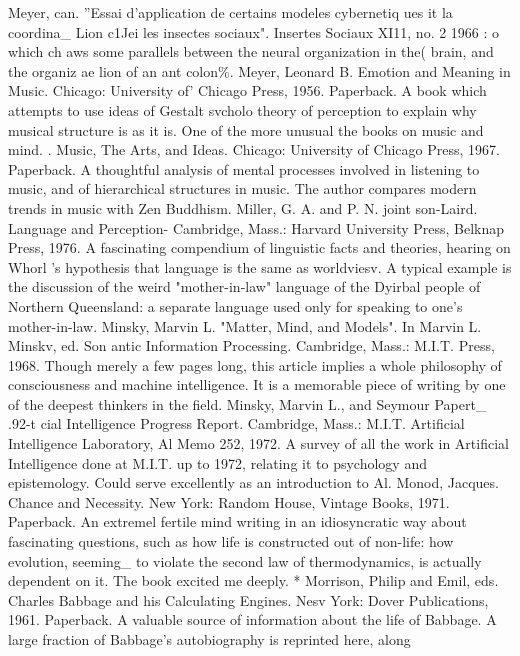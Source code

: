 Meyer, can. ''Essai d'application de certains modeles cybernetiq ues it la coordina\_ Lion
  c1Jei les insectes sociaux". Insertes Sociaux XI11, no. 2 1966 : o which ch aws some
  parallels between the neural organization in the( brain, and the organiz ae lion of an ant
  colon\%.
Meyer, Leonard B. Emotion and Meaning in Music. Chicago: University of' Chicago
  Press, 1956. Paperback. A book which attempts to use ideas of Gestalt svcholo theory
  of perception to explain why musical structure is as it is. One of the more unusual the
  books on music and mind.
. Music, The Arts, and Ideas. Chicago: University of Chicago Press, 1967. Paperback. A
  thoughtful analysis of mental processes involved in listening to music, and of
  hierarchical structures in music. The author compares modern trends in music with Zen
  Buddhism.
Miller, G. A. and P. N. joint son-Laird. Language and Perception- Cambridge, Mass.:
  Harvard University Press, Belknap Press, 1976. A fascinating compendium of linguistic
  facts and theories, hearing on Whorl 's hypothesis that language is the same as
  worldviesv. A typical example is the discussion of the weird "mother-in-law" language
  of the Dyirbal people of Northern Queensland: a separate language used only for
  speaking to one's mother-in-law.
Minsky, Marvin L. "Matter, Mind, and Models". In Marvin L. Minskv, ed. Son antic
  Information Processing. Cambridge, Mass.: M.I.T. Press, 1968. Though merely a few
  pages long, this article implies a whole philosophy of consciousness and machine
  intelligence. It is a memorable piece of writing by one of the deepest thinkers in the
  field.
Minsky, Marvin L., and Seymour Papert\_ .92-t cial Intelligence Progress Report.
  Cambridge, Mass.: M.I.T. Artificial Intelligence Laboratory, Al Memo 252, 1972. A
  survey of all the work in Artificial Intelligence done at M.I.T. up to 1972, relating it to
  psychology and epistemology. Could serve excellently as an introduction to Al.
Monod, Jacques. Chance and Necessity. New York: Random House, Vintage Books,
  1971. Paperback. An extremel fertile mind writing in an idiosyncratic way about
  fascinating questions, such as how life is constructed out of non-life: how evolution,
  seeming\_ to violate the second law of thermodynamics, is actually dependent on it. The
  book excited me deeply.
* Morrison, Philip and Emil, eds. Charles Babbage and his Calculating Engines. Nesv
  York: Dover Publications, 1961. Paperback. A valuable source of information about the
  life of Babbage. A large fraction of Babbage's autobiography is reprinted here, along
